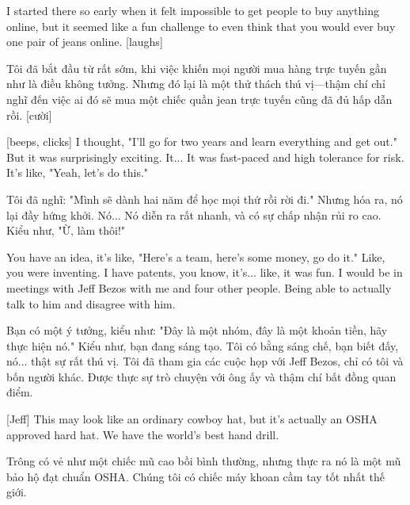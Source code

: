 \documentclass[a4paper]{article}
\begin{document}
	I started there so early when it felt impossible to get people to buy anything online, but it seemed like a fun challenge to even think that you would ever buy one pair of jeans online. [laughs]
	
	\begin{vietnamese-v2}
		Tôi đã bắt đầu từ rất sớm, khi việc khiến mọi người mua hàng trực tuyến gần như là điều không tưởng. 
		Nhưng đó lại là một thử thách thú vị—thậm chí chỉ nghĩ đến việc ai đó sẽ mua một chiếc quần jean trực tuyến cũng đã đủ hấp dẫn rồi. [cười]
	\end{vietnamese-v2}
	
	[beeps, clicks]
	I thought, "I'll go for two years and learn everything and get out." But it was surprisingly exciting.
	It... It was fast-paced and high tolerance for risk. It's like, "Yeah, let's do this."

	\begin{vietnamese-v2}
		Tôi đã nghĩ: "Mình sẽ dành hai năm để học mọi thứ rồi rời đi." 
		Nhưng hóa ra, nó lại đầy hứng khởi. 
		Nó... Nó diễn ra rất nhanh, và có sự chấp nhận rủi ro cao. Kiểu như, "Ừ, làm thôi!"
	\end{vietnamese-v2}

	You have an idea, it's like, "Here's a team, here's some money, go do it."
	Like, you were inventing. I have patents, you know, it's... like, it was fun.
	I would be in meetings with Jeff Bezos with me and four other people.
	Being able to actually talk to him and disagree with him.

	\begin{vietnamese-v2}
		Bạn có một ý tưởng, kiểu như: "Đây là một nhóm, đây là một khoản tiền, hãy thực hiện nó." 
		Kiểu như, bạn đang sáng tạo. 
		Tôi có bằng sáng chế, bạn biết đấy, nó... thật sự rất thú vị. 
		Tôi đã tham gia các cuộc họp với Jeff Bezos, chỉ có tôi và bốn người khác. Được thực sự trò chuyện với ông ấy và thậm chí bất đồng quan điểm.
	\end{vietnamese-v2}

	[Jeff] This may look like an ordinary cowboy hat, but it's actually an OSHA approved hard hat.
	We have the world's best hand drill.
	
	\begin{vietnamese-v2}
		[Jeff] Trông có vẻ như một chiếc mũ cao bồi bình thường, nhưng thực ra nó là một mũ bảo hộ đạt chuẩn OSHA. Chúng tôi có chiếc máy khoan cầm tay tốt nhất thế giới.	
	\end{vietnamese-v2}
	
\end{document}
